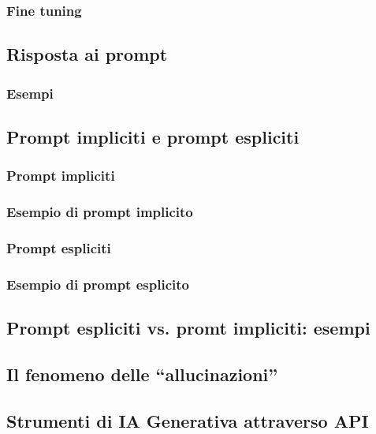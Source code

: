         \subsubsection{Fine tuning}
    \subsection{Risposta ai prompt}
        \subsubsection{Esempi}
    \subsection{Prompt impliciti e prompt espliciti}
        \subsubsection{Prompt impliciti}
        \subsubsection{Esempio di prompt implicito}
        \subsubsection{Prompt espliciti}
        \subsubsection{Esempio di prompt esplicito}
    \subsection{Prompt espliciti vs. promt impliciti: esempi}
    \subsection{Il fenomeno delle ``allucinazioni''}
        
    \subsection{Strumenti di IA Generativa attraverso API}
